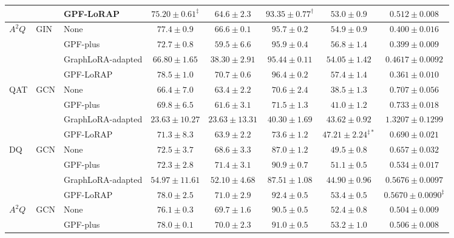 \begin{table}[t]
{\begin{tabular}{lllccccc}
& & GPF-LoRAP & $\mathbf{75.20\pm0.61}^{\ddagger}$ & $\mathbf{64.6\pm2.3}$ & $\mathbf{93.35\pm0.77}^{\dagger}$ & $\mathbf{53.0\pm0.9}$ & $\mathbf{0.512\pm0.008}$ \\
\midrule
\multirow{4}{*}{$A^2Q$} & \multirow{4}{*}{GIN} & None & $\mathit{77.4\pm0.9}$ & $\mathit{66.6\pm0.1}$ & $95.7\pm0.2$ & $54.9\pm0.9$ & $0.400\pm0.016$ \\
& & GPF-plus & $72.7\pm0.8$ & $59.5\pm6.6$ & $\mathit{95.9\pm0.4}$ & $\mathit{56.8\pm1.4}$ & $\mathit{0.399\pm0.009}$ \\
& & GraphLoRA-adapted & $66.80\pm1.65$ & $38.30\pm2.91$ & $95.44\pm0.11$ & $54.05\pm1.42$ & $0.4617\pm0.0092$ \\
& & GPF-LoRAP & $\mathbf{78.5\pm1.0}$ & $\mathbf{70.7\pm0.6}$ & $\mathbf{96.4\pm0.2}$ & $\mathbf{57.4\pm1.4}$ & $\mathbf{0.361\pm0.010}$ \\
\midrule
\midrule
\multirow{4}{*}{QAT} & \multirow{4}{*}{GCN} & None & $66.4\pm7.0$ & $\mathit{63.4\pm2.2}$ & $70.6\pm2.4$ & $38.5\pm1.3$ & $\mathit{0.707\pm0.056}$ \\
& & GPF-plus & $\mathit{69.8\pm6.5}$ & $61.6\pm3.1$ & $\mathit{71.5\pm1.3}$ & $41.0\pm1.2$ & $0.733\pm0.018$ \\
& & GraphLoRA-adapted & $23.63\pm10.27$ & $23.63\pm13.31$ & $40.30\pm1.69$ & $\mathit{43.62\pm0.92}$ & $1.3207\pm0.1299$ \\
& & GPF-LoRAP & $\mathbf{71.3\pm8.3}$ & $\mathbf{63.9\pm2.2}$ & $\mathbf{73.6\pm1.2}$ & $\mathbf{47.21\pm2.24}^{\ddagger *}$ & $\mathbf{0.690\pm0.021}$ \\
\midrule
\multirow{4}{*}{DQ} & \multirow{4}{*}{GCN} & None & $\mathit{72.5\pm3.7}$ & $68.6\pm3.3$ & $87.0\pm1.2$ & $49.5\pm0.8$ & $0.657\pm0.032$ \\
& & GPF-plus & $72.3\pm2.8$ & $\mathbf{71.4\pm3.1}$ & $\mathit{90.9\pm0.7}$ & $\mathit{51.1\pm0.5}$ & $\mathbf{0.534\pm0.017}$ \\
& & GraphLoRA-adapted & $54.97\pm11.61$ & $52.10\pm4.68$ & $87.51\pm1.08$ & $44.90\pm0.96$ & $0.5676\pm0.0097$ \\
& & GPF-LoRAP & $\mathbf{78.0\pm2.5}$ & $\mathit{71.0\pm2.9}$ & $\mathbf{92.4\pm0.5}$ & $\mathbf{53.4\pm0.5}$ & $\mathit{0.5670\pm0.0090}^{\ddagger}$ \\
\midrule
\multirow{4}{*}{$A^2Q$} & \multirow{4}{*}{GCN} & None & $76.1\pm0.3$ & $69.7\pm1.6$ & $90.5\pm0.5$ & $52.4\pm0.8$ & $\mathit{0.504\pm0.009}$ \\
& & GPF-plus & $\mathit{78.0\pm0.1}$ & $\mathit{70.0\pm2.3}$ & $\mathit{91.0\pm0.5}$ & $\mathit{53.2\pm1.0}$ & $0.506\pm0.008$ \\

\end{tabular}}
\end{table}
